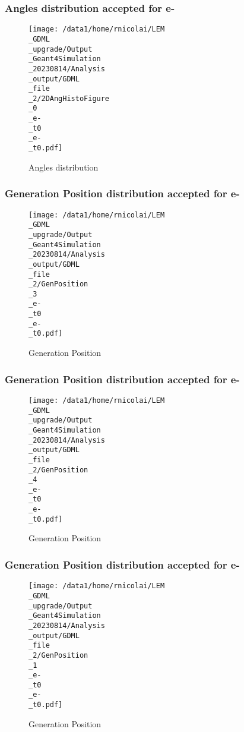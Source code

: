 \documentclass[8pt]{beamer}
\begin{document}
            \begin{frame}
                \frametitle{Angles distribution accepted for e-}
            
        \begin{figure}[h]
            \centering
            \texttt{[image: /data1/home/rnicolai/LEM\\\_GDML\\\_upgrade/Output\\\_Geant4Simulation\\\_20230814/Analysis\\\_output/GDML\\\_file\\\_2/2DAngHistoFigure\\\_0\\\_e-\\\_t0\\\_e-\\\_t0.pdf]}
            \caption{Angles distribution}
        \end{figure}
        
            \end{frame}
            
            \begin{frame}
                \frametitle{Generation Position distribution accepted for e-}
            
        \begin{figure}[h]
            \centering
            \texttt{[image: /data1/home/rnicolai/LEM\\\_GDML\\\_upgrade/Output\\\_Geant4Simulation\\\_20230814/Analysis\\\_output/GDML\\\_file\\\_2/GenPosition\\\_3\\\_e-\\\_t0\\\_e-\\\_t0.pdf]}
            \caption{Generation Position}
        \end{figure}
        
            \end{frame}
            
            \begin{frame}
                \frametitle{Generation Position distribution accepted for e-}
            
        \begin{figure}[h]
            \centering
            \texttt{[image: /data1/home/rnicolai/LEM\\\_GDML\\\_upgrade/Output\\\_Geant4Simulation\\\_20230814/Analysis\\\_output/GDML\\\_file\\\_2/GenPosition\\\_4\\\_e-\\\_t0\\\_e-\\\_t0.pdf]}
            \caption{Generation Position}
        \end{figure}
        
            \end{frame}
            
            \begin{frame}
                \frametitle{Generation Position distribution accepted for e-}
            
        \begin{figure}[h]
            \centering
            \texttt{[image: /data1/home/rnicolai/LEM\\\_GDML\\\_upgrade/Output\\\_Geant4Simulation\\\_20230814/Analysis\\\_output/GDML\\\_file\\\_2/GenPosition\\\_1\\\_e-\\\_t0\\\_e-\\\_t0.pdf]}
            \caption{Generation Position}
        \end{figure}
        
            \end{frame}
            
\end{document}
